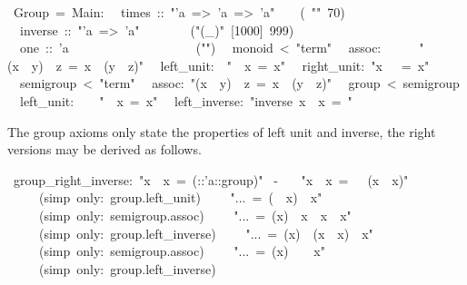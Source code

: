 \begin{isabelle}%
\isanewline
{}~Group~=~Main:\isanewline
\isanewline
\isanewline
{}\isanewline
~~times~::~{"}'a~=>~'a~=>~'a{"}~~~~(~{"}{\isasymOtimes}{"}~70)\isanewline
~~inverse~::~{"}'a~=>~'a{"}~~~~~~~~({"}(\_{\isasyminv}){"}~[1000]~999)\isanewline
~~one~::~'a~~~~~~~~~~~~~~~~~~~~({"}{\isasymunit}{"})\isanewline
\isanewline
\isanewline
{}\isanewline
~~monoid~<~{"}term{"}\isanewline
~~assoc:~~~~~~{"}(x~{\isasymOtimes}~y)~{\isasymOtimes}~z~=~x~{\isasymOtimes}~(y~{\isasymOtimes}~z){"}\isanewline
~~left\_unit:~~{"}{\isasymunit}~{\isasymOtimes}~x~=~x{"}\isanewline
~~right\_unit:~{"}x~{\isasymOtimes}~{\isasymunit}~=~x{"}\isanewline
\isanewline
\isanewline
{}\isanewline
~~semigroup~<~{"}term{"}\isanewline
~~assoc:~{"}(x~{\isasymOtimes}~y)~{\isasymOtimes}~z~=~x~{\isasymOtimes}~(y~{\isasymOtimes}~z){"}\isanewline
\isanewline
{}\isanewline
~~group~<~semigroup\isanewline
~~left\_unit:~~~~{"}{\isasymunit}~{\isasymOtimes}~x~=~x{"}\isanewline
~~left\_inverse:~{"}inverse~x~{\isasymOtimes}~x~=~{\isasymunit}{"}%
\begin{isamarkuptext}%
The group axioms only state the properties of left unit and inverse,
 the right versions may be derived as follows.%
\end{isamarkuptext}%
~group\_right\_inverse:~{"}x~{\isasymOtimes}~x{\isasyminv}~=~({\isasymunit}::'a::group){"}\isanewline
{}~-\isanewline
~~~{"}x~{\isasymOtimes}~x{\isasyminv}~=~{\isasymunit}~{\isasymOtimes}~(x~{\isasymOtimes}~x{\isasyminv}){"}\isanewline
~~~~~(simp~only:~group.left\_unit)\isanewline
~~~~{"}...~=~({\isasymunit}~{\isasymOtimes}~x)~{\isasymOtimes}~x{\isasyminv}{"}\isanewline
~~~~~(simp~only:~semigroup.assoc)\isanewline
~~~~{"}...~=~(x{\isasyminv}){\isasyminv}~{\isasymOtimes}~x{\isasyminv}~{\isasymOtimes}~x~{\isasymOtimes}~x{\isasyminv}{"}\isanewline
~~~~~(simp~only:~group.left\_inverse)\isanewline
~~~~{"}...~=~(x{\isasyminv}){\isasyminv}~{\isasymOtimes}~(x{\isasyminv}~{\isasymOtimes}~x)~{\isasymOtimes}~x{\isasyminv}{"}\isanewline
~~~~~(simp~only:~semigroup.assoc)\isanewline
~~~~{"}...~=~(x{\isasyminv}){\isasyminv}~{\isasymOtimes}~{\isasymunit}~{\isasymOtimes}~x{\isasyminv}{"}\isanewline
~~~~~(simp~only:~group.left\_inverse)\isanewline

\end{isabelle}
